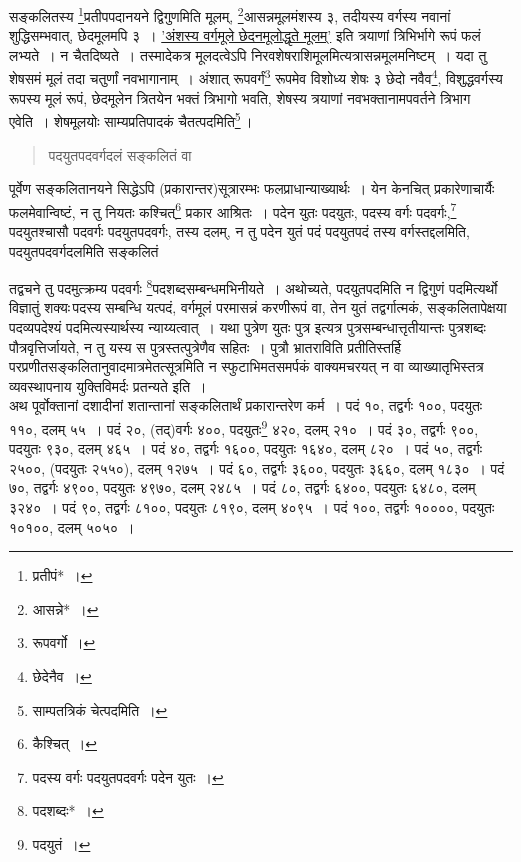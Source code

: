 \documentclass[10pt, openany]{book}
\begin{document}
{{सङ्कलितस्य \renewcommand{\thefootnote}{\s ५}\footnote{\s प्रतीपं*~।}प्रतीपपदानयने द्विगुणमिति मूलम्, \renewcommand{\thefootnote}{\s ६}\footnote{\s आसन्ने*~।}आसन्नमूलमंशस्य ३,
तदीयस्य वर्गस्य नवानां शुद्धिसम्भवात्, छेदमूलमपि ३~। \hyperref[34]{'अंशस्य वर्गमूले छेदनमूलोद्धृते
मूलम्'} इति त्रयाणां}
{त्रिभिर्भागे रूपं फलं लभ्यते~। न चैतदिष्यते~। तस्मादेकत्र मूलदत्वेऽपि
निरवशेषराशिमूलमित्यत्रासन्नमूलमनिष्टम्~। यदा तु शेषसमं मूलं तदा चतुर्णां नवभागानाम्~।
अंशात् रूपवर्गं\renewcommand{\thefootnote}{\s ७}\footnote{\s रूपवर्गो~।}}
{रूपमेव विशोध्य शेषः ३ छेदो नवैव\renewcommand{\thefootnote}{\s  ८}\footnote{\s छेदेनैव~।}, विशुद्धवर्गस्य रूपस्य मूलं रूपं,
छेदमूलेन त्रितयेन}
{भक्तं त्रिभागो भवति, शेषस्य त्रयाणां नवभक्तानामपवर्तने त्रिभाग एवेति~।
शेषमूलयोः}
{साम्यप्रतिपादकं चैतत्पदमिति\renewcommand{\thefootnote}{\s ९}\footnote{\s साम्पतत्रिकं चेत्पदमिति~।}\,।}

 \label{15.1}
\begin{quote}
    
{\bs पदयुतपदवर्गदलं सङ्कलितं वा}\end{quote}

{पूर्वेण सङ्कलितानयने सिद्धेऽपि (प्रकारान्तर)सूत्रारम्भः
फलप्राधान्याख्यार्थः~। येन}
{केनचित् प्रकारेणाचार्यैः फलमेवान्विष्टं, न तु नियतः कश्चित्\renewcommand{\thefootnote}{\s  १०}\footnote{\s कैश्चित्~।}
प्रकार आश्रितः~।}
{पदेन युतः पदयुतः, पदस्य वर्गः पदवर्गः,\renewcommand{\thefootnote}{\s ११}\footnote{\s पदस्य वर्गः पदयुतपदवर्गः पदेन युतः~।} पदयुतश्चासौ पदवर्गः
पदयुतपदवर्गः, तस्य दलम्,}
{न तु पदेन युतं पदं पदयुतपदं तस्य वर्गस्तद्दलमिति, पदयुतपदवर्गदलमिति
सङ्कलितं}


\newpage

{तद्वचने तु पदमुत्क्रम्य पदवर्गः \renewcommand{\thefootnote}{\s १}\footnote{\s पदशब्दः*~।}पदशब्दसम्बन्धमभिनीयते~। अथोच्यते,
पदयुतपदमिति}
{न द्विगुणं पदमित्यर्थो विज्ञातुं शक्यः\textendash \,पदस्य सम्बन्धि यत्पदं,
वर्गमूलं परमासन्नं करणीरूपं}
{वा, तेन युतं तद्वर्गात्मकं, सङ्कलितापेक्षया पदव्यपदेश्यं
पदमित्यस्यार्थस्य न्याय्यत्वात्~। यथा}
{पुत्रेण युतः पुत्र इत्यत्र पुत्रसम्बन्धात्तृतीयान्तः पुत्रशब्दः
पौत्रवृत्तिर्जायते, न तु यस्य स पुत्रस्तत्पुत्रेणैव}
{सहितः~। पुत्रौ भ्रातराविति प्रतीतिस्तर्हि
परप्रणीतसङ्कलितानुवादमात्रमेतत्सूत्रमिति न स्फुटाभिमतसमर्पकं 
वाक्यमचरयत् न वा व्याख्यातृभिस्तत्र व्यवस्थापनाय युक्तिविमर्दः
प्रतन्यते इति~।}\\

{अथ पूर्वोक्तानां दशादीनां शतान्तानां सङ्कलितार्थं प्रकारान्तरेण कर्म~।
पदं १०,}
{तद्वर्गः १००, पदयुतः ११०, दलम् ५५~। पदं २०, (तद्)वर्गः ४००, पदयुतः\renewcommand{\thefootnote}{\s २}\footnote{\s पदयुतं~।}
४२०, दलम्}
{२१०~। पदं ३०, तद्वर्गः ९००, पदयुतः ९३०, दलम् ४६५~। पदं ४०, तद्वर्गः
१६००,}
{पदयुतः १६४०, दलम् ८२०~। पदं ५०, तद्वर्गः २५००, (पदयुतः २५५०), दलम् १२७५~।}
{पदं ६०, तद्वर्गः ३६००, पदयुतः ३६६०, दलम् १८३०~। पदं ७०, तद्वर्गः ४९००,
पदयुतः}
{४९७०, दलम् २४८५~। पदं ८०, तद्वर्गः ६४००, पदयुतः ६४८०, दलम् ३२४०~। पदं
९०,}
{तद्वर्गः ८१००, पदयुतः ८१९०, दलम् ४०९५~। पदं १००, तद्वर्गः १००००, पदयुतः}
{१०१००, दलम् ५०५०~।}

}
\end{document}
